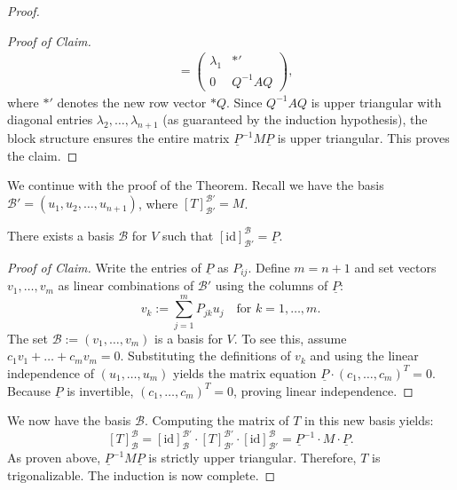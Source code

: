 \begin{proof}
\begin{proof}[Proof of Claim]
\begin{align*}
      &= \left(\begin{array}{c|c} \lambda_1 & *' \\ \hline 0 & Q^{-1}AQ \end{array}\right),
    \end{align*}
    where $*'$ denotes the new row vector $*Q$.
    Since $Q^{-1}AQ$ is upper triangular with diagonal entries $\lambda_2, \dots, \lambda_{n+1}$ (as guaranteed by the induction hypothesis), the block structure ensures the entire matrix $\underline{P}^{-1}M\underline{P}$ is upper triangular. This proves the claim.
  \end{proof}

  We continue with the proof of the Theorem. Recall we have the basis $\mathcal{B}' = (u_1, u_2, \dots, u_{n+1})$, where $[T]_{\mathcal{B}'}^{\mathcal{B}'} = M$.

  \begin{claim*}\label{claim:trig_basis_exists}
    There exists a basis $\mathcal{B}$ for $V$ such that $[\mathrm{id}]_{\mathcal{B}'}^{\mathcal{B}} = \underline{P}$.
  \end{claim*}

  \begin{proof}[Proof of Claim]
    Write the entries of $\underline{P}$ as $P_{ij}$. Define $m = n+1$ and set vectors $v_1, \dots, v_m$ as linear combinations of $\mathcal{B}'$ using the columns of $\underline{P}$:
    \[ v_k := \sum_{j=1}^m P_{jk} u_j \quad \text{for } k = 1, \dots, m. \]
    The set $\mathcal{B} := (v_1, \dots, v_m)$ is a basis for $V$.
    To see this, assume $c_1 v_1 + \dots + c_m v_m = 0$. Substituting the definitions of $v_k$ and using the linear independence of $(u_1, \dots, u_m)$ yields the matrix equation $\underline{P} \cdot (c_1, \dots, c_m)^T = 0$.
    Because $\underline{P}$ is invertible, $(c_1, \dots, c_m)^T = 0$, proving linear independence.
  \end{proof}

  We now have the basis $\mathcal{B}$. Computing the matrix of $T$ in this new basis yields:
  \begin{equation} \label{eq:final_trigonal_matrix}
    [T]_{\mathcal{B}}^{\mathcal{B}} = [\mathrm{id}]_{\mathcal{B}}^{\mathcal{B}'} \cdot [T]_{\mathcal{B}'}^{\mathcal{B}'} \cdot [\mathrm{id}]_{\mathcal{B}'}^{\mathcal{B}} = \underline{P}^{-1} \cdot M \cdot \underline{P}.
  \end{equation}
  As proven above, $\underline{P}^{-1} M \underline{P}$ is strictly upper triangular. Therefore, $T$ is trigonalizable. The induction is now complete.
\end{proof}

